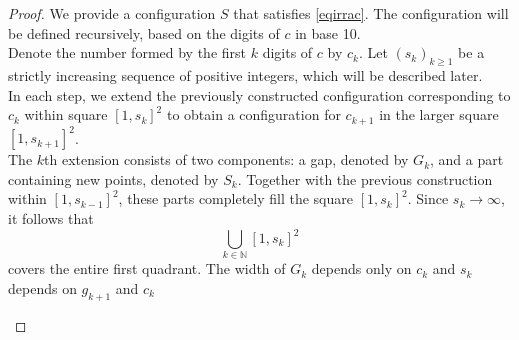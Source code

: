 \documentclass[11pt,a4paper]{article}
\numberwithin{equation}{section}
\newcommand{\nn}{\mathbb{N}}
\begin{document}
\begin{proof}
We provide a configuration $S$ that satisfies \eqref{eqirrac}. The configuration will be defined recursively, based on the digits of $c$ in base 10. \\ Denote the number formed by the first $k$ digits of $c$ by $c_k$.
 Let $(s_k)_{k\ge1}$ be a strictly increasing sequence of positive integers, which will be described later. \\
In each step, we extend the previously constructed configuration corresponding to $c_k$ within square $[1, s_k]^2$ to obtain a configuration for $c_{k+1}$ in the larger square $[1,s_{k+1}]^2$. \\
The $k$th extension consists of two components: a gap, denoted by $G_k$, and a part containing new points, denoted by $S_k$. Together with the previous construction within $[1,s_{k-1}]^2$, these parts completely fill the square $[1,s_k]^2$. Since $s_k\to \infty$, it follows that $$\bigcup_{k\in\nn} [1,s_k]^2$$ covers the entire first quadrant. The width of $G_k$ depends only on $c_k$ and $s_k$ depends on $g_{k+1}$ and $c_k$\\

\begin{figure}[!hbt]
\centering
{}
\end{figure}
\end{proof}
\end{document}

